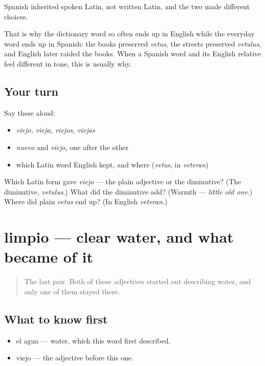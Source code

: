 \begin{grammarlens}[title={What you've built}]
Spanish inherited spoken Latin, not written Latin, and the two made different choices.

That is why the dictionary word so often ends up in English while the everyday word ends up in Spanish: the books preserved \emph{vetus}, the streets preserved \emph{vetulus}, and English later raided the books. When a Spanish word and its English relative feel different in tone, this is usually why.
\end{grammarlens}

\subsection*{Your turn}
Say these aloud:

\begin{itemize}
\raggedright
  \item \emph{viejo, vieja, viejos, viejas}
  \item \emph{nuevo} and \emph{viejo}, one after the other
  \item which Latin word English kept, and where (\emph{vetus}, in \emph{veteran})
\end{itemize}

\begin{tcolorbox}[breakable,colback=teal!4,colframe=teal!35!black,title={Before you move on}]
Which Latin form gave \emph{viejo} — the plain adjective or the diminutive? (The diminutive, \emph{vetulus}.) What did the diminutive add? (Warmth — \emph{little old one}.) Where did plain \emph{vetus} end up? (In English \emph{veteran}.)
\end{tcolorbox}
\section[limpio]{limpio — clear water, and what became of it}

\label{lesson:ES-C281-limpio}



\begin{quote}
The last pair. Both of these adjectives started out describing water, and only one of them stayed there.
\end{quote}

\subsection*{What to know first}
\begin{itemize}
\raggedright
  \item el agua — water, which this word first described.
  \item viejo — the adjective before this one.
\end{itemize}

